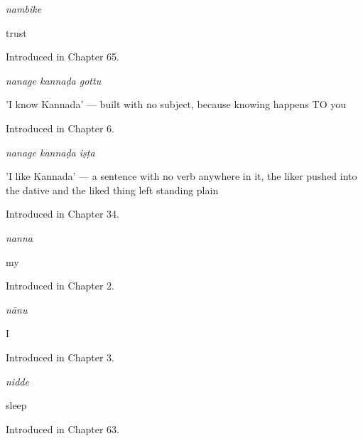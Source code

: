 \noindent\begin{minipage}[t]{\linewidth}
\raggedright
\textbf{}\enspace\emph{nambike}\par
\small trust\par
\footnotesize Introduced in Chapter 65.
\end{minipage}\par\medskip

\noindent\begin{minipage}[t]{\linewidth}
\raggedright
\textbf{  }\enspace\emph{nanage kannaḍa gottu}\par
\small 'I know Kannada' — built with no subject, because knowing happens TO you\par
\footnotesize Introduced in Chapter 6.
\end{minipage}\par\medskip

\noindent\begin{minipage}[t]{\linewidth}
\raggedright
\textbf{  }\enspace\emph{nanage kannaḍa iṣṭa}\par
\small 'I like Kannada' — a sentence with no verb anywhere in it, the liker pushed into the dative and the liked thing left standing plain\par
\footnotesize Introduced in Chapter 34.
\end{minipage}\par\medskip

\noindent\begin{minipage}[t]{\linewidth}
\raggedright
\textbf{}\enspace\emph{nanna}\par
\small my\par
\footnotesize Introduced in Chapter 2.
\end{minipage}\par\medskip

\noindent\begin{minipage}[t]{\linewidth}
\raggedright
\textbf{}\enspace\emph{nānu}\par
\small I\par
\footnotesize Introduced in Chapter 3.
\end{minipage}\par\medskip

\noindent\begin{minipage}[t]{\linewidth}
\raggedright
\textbf{}\enspace\emph{nidde}\par
\small sleep\par
\footnotesize Introduced in Chapter 63.
\end{minipage}\par\medskip

